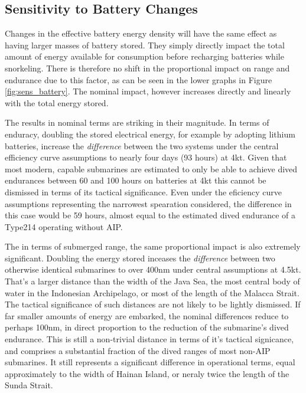 \documentclass{article}\usepackage[]{graphicx}\usepackage[]{color}
\begin{document}
\subsection{Sensitivity to Battery Changes}

Changes in the effective battery energy density will have the same effect as having larger masses of battery stored.  They simply directly impact the total amount of energy available for consumption before recharging batteries while snorkeling. There is therefore no shift in the proportional impact on range and endurance due to this factor, as can be seen in the lower graphs in Figure \ref{fig:sens_battery}.  The nominal impact, however increases directly and linearly with the total energy stored.

The results in nominal terms are striking in their magnitude.  In terms of enduracy, doubling the stored electrical energy, for example by adopting lithium batteries, increase the \textit{difference} between the two systems under the central efficiency curve assumptions to nearly four days (93 hours) at 4kt.  Given that most modern, capable submarines are estimated to only be able to achieve dived endurances between 60 and 100 hours on batteries at 4kt \parencite{buckingham2008submarine} this cannot be dismissed in terms of its tactical significance.  Even under the eficiency curve assumptions representing the narrowest spearation considered, the difference in this case would be 59 hours, almost equal to the estimated dived endurance of a Type214 operating without AIP.

The in terms of submerged range, the same proportional impact is also extremely significant.  Doubling the energy stored inceases the \textit{difference} between two otherwise identical submarines to over 400nm under central assumptions at 4.5kt.  That's a larger distance than the width of the Java Sea, the most central body of water in the Indonesian Archipelago, or most of the length of the Malacca Strait.  The tactical significance of such distances are not likely to be lightly dismissed. If far smaller amounts of energy are embarked, the nominal differences reduce to perhaps 100nm, in direct proportion to the reduction of the submarine's dived endurance.  This is still a non-trivial distance in terms of it's tactical signicance, and comprises a substantial fraction of the dived ranges of most non-AIP submarines.  It still represents a significant difference in operational terms, equal approximately to the width of Hainan Island, or neraly twice the length of the Sunda Strait.
\end{document}
